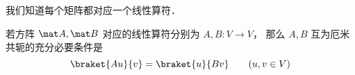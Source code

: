 

我们知道每个矩阵都对应一个线性算符．

\begin{theorem}{}
若方阵 $\mat A, \mat B$ 对应的线性算符分别为 $A, B:V\to V$， 那么 $A, B$ 互为厄米共轭的充分必要条件是
\begin{equation}
\braket{Au}{v} = \braket{u}{B v} \qquad (u, v \in V)
\end{equation}
\end{theorem}

